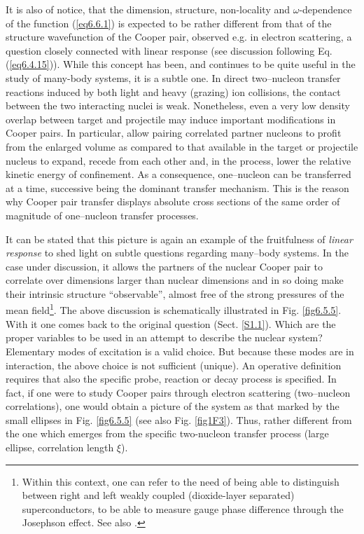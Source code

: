 It is also of notice, that the dimension, structure, non-locality and $\omega$-dependence of the function (\ref{eq6.6.1}) is expected to be rather different from that of the structure wavefunction of the Cooper pair, observed e.g. in electron scattering, a question closely connected with linear response (see discussion following Eq. (\ref{eq6.4.15})). While this concept has been, and continues to be quite useful in the study of many-body systems, it is a subtle one. In direct two--nucleon transfer reactions induced by both light and heavy (grazing) ion  collisions, the contact between the two interacting nuclei is weak. Nonetheless, even a very low density overlap between target and projectile may induce important modifications in Cooper pairs. In particular, allow pairing correlated partner nucleons  to profit from the enlarged volume as compared to that available in the target or projectile nucleus to expand, recede from each other and, in the process, lower the relative kinetic energy of confinement. As a consequence, one--nucleon can be transferred at a time, successive being the dominant transfer mechanism. This is the reason why Cooper pair transfer displays absolute cross sections of the same order of magnitude of one--nucleon transfer processes. 


It can be stated that this picture is again an example of the fruitfulness of \textit{linear response} to shed light on subtle questions regarding many--body systems. In the case under discussion, it allows the partners of the nuclear Cooper pair to correlate over dimensions larger than nuclear dimensions and in so doing make their intrinsic structure ``observable'', almost free of the strong pressures of the  mean field\footnote{Within this context, one can refer to  the need of being able to distinguish between   right and left weakly coupled (dioxide-layer separated) superconductors,  to be able to measure gauge phase difference through the Josephson effect. See also \cite{Magierski:17}.}. The above discussion is schematically illustrated in Fig. \ref{fig6.5.5}. With it one comes back to the original question (Sect. \ref{S1.1}). Which are the proper variables to be used in an attempt to describe the nuclear system? Elementary modes of excitation is a valid choice. But because these modes are in interaction, the above choice is not sufficient (unique). An operative definition requires that also the specific probe, reaction or decay process is specified. In fact, if one were to study Cooper pairs through electron scattering (two--nucleon correlations), one would obtain a picture of the system as that marked by the small ellipses in Fig. \ref{fig6.5.5} (see also Fig. \ref{fig1F3}). Thus, rather different from the one  which emerges from the specific two-nucleon transfer process (large ellipse, correlation length $\xi$).  
